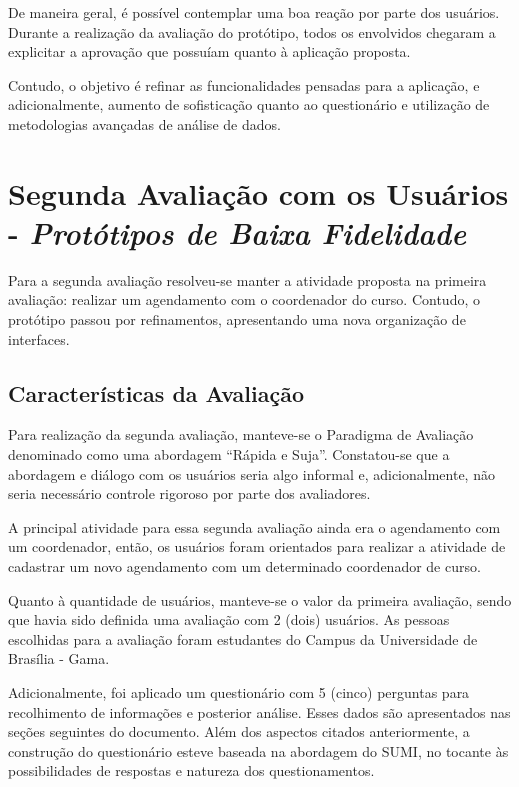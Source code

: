 			De maneira geral, é possível contemplar uma boa reação por parte dos usuários. Durante a realização da avaliação do protótipo, todos os envolvidos chegaram a explicitar a aprovação que possuíam quanto à aplicação proposta.
		
			Contudo, o objetivo é refinar as funcionalidades pensadas para a aplicação, e adicionalmente, aumento de sofisticação quanto ao questionário e utilização de metodologias avançadas de análise de dados.


	\section[Segunda Avaliação com os Usuários - Protótipos de Baixa Fidelidade]{Segunda Avaliação com os Usuários - \emph{Protótipos de Baixa Fidelidade}}
	\label{sec:avaliacaoPrototipos_Segunda}

		Para a segunda avaliação resolveu-se manter a atividade proposta na primeira avaliação: realizar um agendamento com o coordenador do curso. Contudo, o protótipo passou por refinamentos, apresentando uma nova organização de interfaces.

		\subsection[Características da Avaliação]{Características da Avaliação}
		\label{sec:segundaAvaliacao_Caracteristicas}

			Para realização da segunda avaliação, manteve-se o Paradigma de Avaliação denominado como uma abordagem “Rápida e Suja”. Constatou-se que a abordagem e diálogo com os usuários seria algo informal e, adicionalmente, não seria necessário controle rigoroso por parte dos avaliadores.

			A principal atividade para essa segunda avaliação ainda era o agendamento com um coordenador, então, os usuários foram orientados para realizar a atividade de cadastrar um novo agendamento com um determinado coordenador de curso.

			Quanto à quantidade de usuários, manteve-se o valor da primeira avaliação, sendo que havia sido definida uma avaliação com 2 (dois) usuários. As pessoas escolhidas para a avaliação foram estudantes do Campus da Universidade de Brasília - Gama.

			Adicionalmente, foi aplicado um questionário com 5 (cinco) perguntas para recolhimento de informações e posterior análise. Esses dados são apresentados nas seções seguintes do documento. Além dos aspectos citados anteriormente, a construção do questionário esteve baseada na abordagem do SUMI, no tocante às possibilidades de respostas e natureza dos questionamentos.

